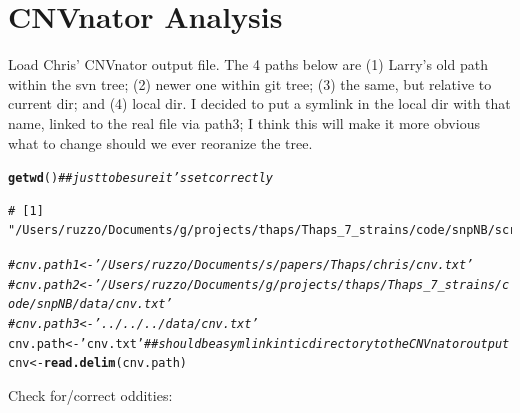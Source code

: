 \documentclass{article}\usepackage[]{graphicx}\usepackage[]{color}
\makeatletter
\newcommand{\hlstr}[1]{\textcolor[rgb]{0.192,0.494,0.8}{#1}}%
\newcommand{\hlcom}[1]{\textcolor[rgb]{0.678,0.584,0.686}{\textit{#1}}}%
\newcommand{\hlstd}[1]{\textcolor[rgb]{0.345,0.345,0.345}{#1}}%
\newcommand{\hlkwb}[1]{\textcolor[rgb]{0.69,0.353,0.396}{#1}}%
\newcommand{\hlkwd}[1]{\textcolor[rgb]{0.737,0.353,0.396}{\textbf{#1}}}%
\newenvironment{kframe}{%
 \def\at@end@of@kframe{}%
 \ifinner\ifhmode%
  \def\at@end@of@kframe{\end{minipage}}%
  \begin{minipage}{\columnwidth}%
 \fi\fi%
 \def\FrameCommand##1{\hskip\@totalleftmargin \hskip-\fboxsep
 \colorbox{shadecolor}{##1}\hskip-\fboxsep
     \hskip-\linewidth \hskip-\@totalleftmargin \hskip\columnwidth}%
 \MakeFramed {\advance\hsize-\width
   \@totalleftmargin\z@ \linewidth\hsize
   \@setminipage}}%
 {\par\unskip\endMakeFramed%
 \at@end@of@kframe}
\newenvironment{knitrout}{}{} %
\makeatother
\begin{document}
\section{CNVnator Analysis}

Load Chris' CNVnator output file.  The 4 paths below are 
(1) Larry's old path within the svn tree; 
(2) newer one within git tree; 
(3) the same, but relative to current dir; and 
(4) local dir. 
I decided to put a symlink in the local dir with that name, linked to the real file via path3;
I think this will make it more obvious what to change should we ever reoranize the tree.

\begin{knitrout}\footnotesize
{}\color{fgcolor}\begin{kframe}
\begin{alltt}
\hlkwd{getwd}\hlstd{()} \hlcom{## just to be sure it's set correctly}
\end{alltt}
\begin{verbatim}
# [1] "/Users/ruzzo/Documents/g/projects/thaps/Thaps_7_strains/code/snpNB/scripts/larrys/tic"
\end{verbatim}
\begin{alltt}
\hlcom{#cnv.path1 <- '/Users/ruzzo/Documents/s/papers/Thaps/chris/cnv.txt'}
\hlcom{#cnv.path2 <- '/Users/ruzzo/Documents/g/projects/thaps/Thaps_7_strains/code/snpNB/data/cnv.txt'}
\hlcom{#cnv.path3 <- '../../../data/cnv.txt'}
\hlstd{cnv.path} \hlkwb{<-} \hlstr{'cnv.txt'}  \hlcom{## should be a symlink in tic directory to the CNVnator output}
\hlstd{cnv} \hlkwb{<-} \hlkwd{read.delim}\hlstd{(cnv.path)}
\end{alltt}
\end{kframe}
\end{knitrout}

Check for/correct oddities:
\end{document}

